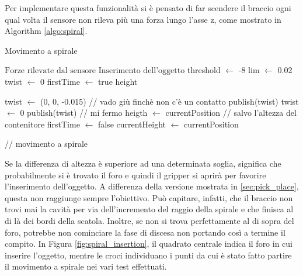 Per implementare questa funzionalit\`{a} si \`{e} pensato di far scendere il braccio ogni qual volta il sensore non rileva pi\`{u}
una forza lungo l'asse z, come mostrato in Algorithm \ref{algo:spiral}. 
\newpage
\begin{algorithm}[H]
    \caption{Movimento a spirale}\label{algo:spiral}
    \begin{algorithmic}[1]
        \Require $\text{Forze rilevate dal sensore}$
        \Ensure $\text{Inserimento dell'oggetto}$
        \State threshold $\gets$ -8
        \State lim $\gets$ 0.02
        \State twist $\gets$ 0
        \State firstTime $\gets$ true
        \State height
        
        \Repeat 
                \State twist $\gets$ (0, 0, -0.015) // vado gi\`{u} finch\`{e} non c'\`{e} un contatto
                \State publish(twist)
            \EndWhile
            \State twist $\gets$ 0
            \State publish(twist) // mi fermo
                \State heigth $\gets$ currentPosition // salvo l'altezza del contenitore
                \State firstTime $\gets$ false
            \EndIf
            \State currentHeight $\gets$ currentPosition

                // movimento a spirale
            \EndWhile
    \end{algorithmic}
    \end{algorithm}
Se la differenza di altezza \`{e} superiore ad una determinata soglia, significa che probabilmente si \`{e} 
trovato il foro e quindi il gripper si aprir\`{a} per favorire l'inserimento dell'oggetto. 
A differenza della versione mostrata in \ref{sec:pick_place}, questa non raggiunge sempre l'obiettivo. 
Pu\`{o} capitare, infatti, che il braccio non trovi mai la cavit\`{a} per via dell'incremento del raggio della spirale e che finisca 
al di l\`{a} dei bordi della scatola. Inoltre, se non si trova perfettamente al di sopra del foro, potrebbe non cominciare la 
fase di discesa non portando cos\`{i} a termine il compito. 
In Figura \ref{fig:spiral_insertion}, il quadrato centrale indica il foro in cui inserire l'oggetto, mentre le croci individuano i 
punti da cui \`{e} stato fatto partire il movimento a spirale nei vari test effettuati. 
